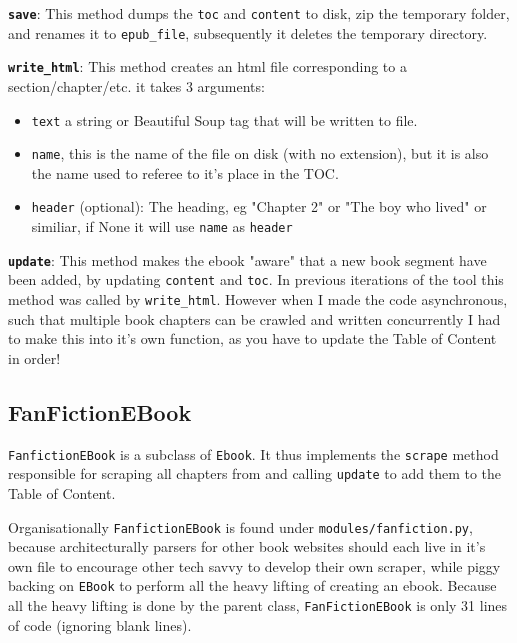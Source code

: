 \documentclass[]{report}   %
\begin{document}
\textbf{\texttt{save}}: This method dumps the \texttt{toc} and \texttt{content} to disk, zip the temporary folder, and renames it to \texttt{epub\_file}, subsequently it deletes the temporary directory.

\textbf{\texttt{write\_html}}: This method creates an html file corresponding to a section/chapter/etc. it takes 3 arguments:
\begin{itemize}
	\item \texttt{text} a string or Beautiful Soup tag that will be written to file.
	\item \texttt{name}, this is the name of the file on disk (with no extension), but it is also the name used to referee to it's place in the TOC. 
	\item \texttt{header} (optional): The heading, eg "Chapter 2" or "The boy who lived" or similiar, if None it will use \texttt{name} as \texttt{header}
\end{itemize}

\textbf{\texttt{update}}: This method makes the ebook "aware" that a new book segment
have been added, by updating \texttt{content} and \texttt{toc}. In previous
iterations of the tool this method was called by \texttt{write\_html}. However
when I made the code asynchronous, such that multiple book chapters can be
crawled and written concurrently I had to make this into it's own function, as
you have to update the Table of Content in order!

\subsection{FanFictionEBook}
\label{sec:FanFictionEBook}
\texttt{FanfictionEBook} is a subclass of \texttt{Ebook}. It thus implements the \texttt{scrape} method responsible for scraping all chapters from and calling \texttt{update} to add them to the Table of Content.

Organisationally \texttt{FanfictionEBook} is found under
\texttt{modules/fanfiction.py}, because architecturally parsers for other book
websites should each live in it's own file to encourage other tech savvy to
develop their own scraper, while piggy backing on \texttt{EBook} to perform all
the heavy lifting of creating an ebook. Because all the heavy lifting is done
by the parent class, \texttt{FanFictionEBook} is only 31 lines of code
(ignoring blank lines). 
\end{document}
